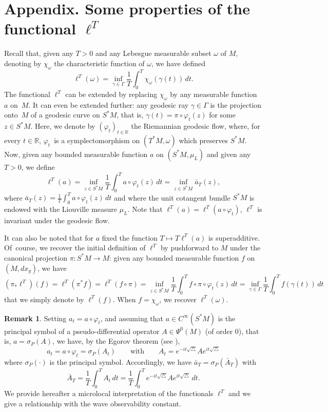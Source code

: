 \documentclass[JEP,XML,SOM,Unicode, NoEqCountersInSection,NoFloatCountersInSection,published]{cedram}
\def\R{\mathbb{R}}
\theoremstyle{definition}
\newtheorem{remark}{Remark}
\begin{document}
\appendix
{}\section*{Appendix. Some properties of the functional \texorpdfstring{$\ell^T$}{lT}}\label{app_ellT}
Recall that, given any $T>0$ and any Lebesgue measurable subset $\omega$ of $M$, denoting by $\chi_\omega$ the characteristic function of $\omega$, we have defined
\[
\ell^T(\omega) = \inf_{\gamma\in\Gamma} \frac{1}{T} \int_0^T \chi_\omega(\gamma(t))\, dt.
\]
The functional $\ell^T$ can be extended by replacing $\chi_\omega$ by any measurable function~$a$ on~$M$. It can even be extended further:
any geodesic ray $\gamma\in\Gamma$ is the projection onto~$M$ of a geodesic curve on $S^*M$, that is, $\gamma(t) = \pi\circ\varphi_t(z)$ for some $z\in S^*M$. Here, we denote by $(\varphi_t)_{t\in\R}$ the Riemannian geodesic flow, where, for every $t\in\R$, $\varphi_t$~is a symplectomorphism on $(T^*M,\omega)$ which preserves $S^*M$.
Now, given any bounded measurable function $a$ on $(S^*M,\mu_L)$ and given any $T>0$, we define
\[
\ell^T(a) = \inf_{z\in S^*M} \frac{1}{T} \int_0^T a\circ\varphi_t(z)\, dt = \inf_{z\in S^*M} \bar a_T(z),
\]
where $\bar a_T(z) = \frac{1}{T} \int_0^T a\circ\varphi_t(z)\, dt$
and where the unit cotangent bundle $S^*M$ is endowed with the Liouville measure $\mu_L$.
Note that $\ell^T(a)=\ell^T(a\circ\varphi_t)$, \ie $\ell^T$ is invariant under the geodesic flow.

It can also be noted that for $a$ fixed the function $T\mapsto T \ell^T(a)$ is superadditive. Of~course, we recover the initial definition of $\ell^T$ by pushforward to $M$ under the canonical projection $\pi:S^*M\rightarrow M$: given any bounded measurable function $f$ on $(M,dx_g)$, we have
\[
(\pi_*\ell^T)(f) = \ell^T(\pi^*f) = \ell^T(f\circ\pi) = \inf_{z\in S^*M} \frac{1}{T} \int_0^T f\circ\pi\circ\varphi_t(z)\, dt = \inf_{\gamma\in\Gamma} \frac{1}{T} \int_0^T f(\gamma(t))\, dt
\]
that we simply denote by $\ell^T(f)$. When $f=\chi_\omega$, we recover $\ell^T(\omega)$.

\begin{remark}\label{remEgorov}
Setting $a_t=a\circ\varphi_t$, and assuming that {$a\in C^\infty(S^*M)$} is the principal symbol of a pseudo-differential operator $A\in\Psi^0(M)$ (of order $0$), that is, $a=\sigma_P(A)$, we have, by the Egorov theorem (see \cite{Zworski}),
\[
a_t = a\circ\varphi_t = \sigma_P(A_t)\qquad\textrm{with}\qquad A_t = e^{-it\sqrt{\triangle}}Ae^{it\sqrt{\triangle}}
\]
where $\sigma_P(\cdot)$ is the principal symbol.
Accordingly, we have $\bar a_T=\sigma_P(\bar A_T)$ with
\[
\bar A_T=\frac{1}{T}\int_0^T A_t\, dt=\frac{1}{T}\int_0^T e^{-it\sqrt{\triangle}}Ae^{it\sqrt{\triangle}}\, dt.
\]
We provide hereafter a microlocal interpretation of the functionals $\ell^T$ and we give a relationship with the wave observability constant.
\end{remark}
\end{document}
